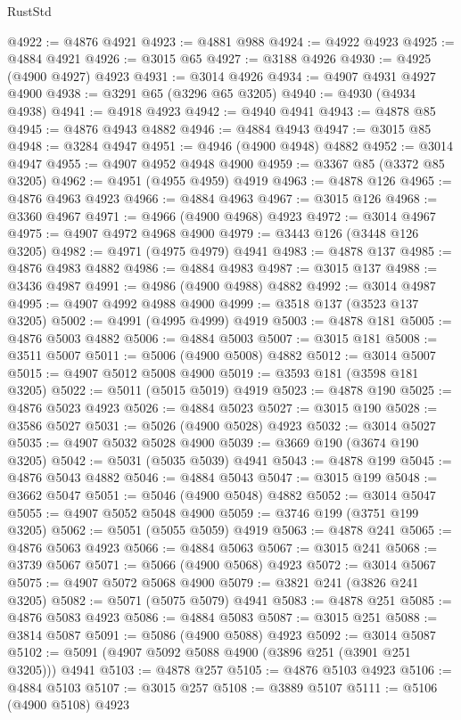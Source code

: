 \begin{lexlean}{RustStd}
\begin{coremodule}
@4922 := @4876 @4921
@4923 := @4881 @988
@4924 := @4922 @4923
@4925 := @4884 @4921
@4926 := @3015 @65
@4927 := @3188 @4926
@4930 := @4925 (@4900 @4927) @4923
@4931 := @3014 @4926
@4934 := @4907 @4931 @4927 @4900
@4938 := @3291 @65 (@3296 @65 @3205)
@4940 := @4930 (@4934 @4938)
@4941 := @4918 @4923
@4942 := @4940 @4941
@4943 := @4878 @85
@4945 := @4876 @4943 @4882
@4946 := @4884 @4943
@4947 := @3015 @85
@4948 := @3284 @4947
@4951 := @4946 (@4900 @4948) @4882
@4952 := @3014 @4947
@4955 := @4907 @4952 @4948 @4900
@4959 := @3367 @85 (@3372 @85 @3205)
@4962 := @4951 (@4955 @4959) @4919
@4963 := @4878 @126
@4965 := @4876 @4963 @4923
@4966 := @4884 @4963
@4967 := @3015 @126
@4968 := @3360 @4967
@4971 := @4966 (@4900 @4968) @4923
@4972 := @3014 @4967
@4975 := @4907 @4972 @4968 @4900
@4979 := @3443 @126 (@3448 @126 @3205)
@4982 := @4971 (@4975 @4979) @4941
@4983 := @4878 @137
@4985 := @4876 @4983 @4882
@4986 := @4884 @4983
@4987 := @3015 @137
@4988 := @3436 @4987
@4991 := @4986 (@4900 @4988) @4882
@4992 := @3014 @4987
@4995 := @4907 @4992 @4988 @4900
@4999 := @3518 @137 (@3523 @137 @3205)
@5002 := @4991 (@4995 @4999) @4919
@5003 := @4878 @181
@5005 := @4876 @5003 @4882
@5006 := @4884 @5003
@5007 := @3015 @181
@5008 := @3511 @5007
@5011 := @5006 (@4900 @5008) @4882
@5012 := @3014 @5007
@5015 := @4907 @5012 @5008 @4900
@5019 := @3593 @181 (@3598 @181 @3205)
@5022 := @5011 (@5015 @5019) @4919
@5023 := @4878 @190
@5025 := @4876 @5023 @4923
@5026 := @4884 @5023
@5027 := @3015 @190
@5028 := @3586 @5027
@5031 := @5026 (@4900 @5028) @4923
@5032 := @3014 @5027
@5035 := @4907 @5032 @5028 @4900
@5039 := @3669 @190 (@3674 @190 @3205)
@5042 := @5031 (@5035 @5039) @4941
@5043 := @4878 @199
@5045 := @4876 @5043 @4882
@5046 := @4884 @5043
@5047 := @3015 @199
@5048 := @3662 @5047
@5051 := @5046 (@4900 @5048) @4882
@5052 := @3014 @5047
@5055 := @4907 @5052 @5048 @4900
@5059 := @3746 @199 (@3751 @199 @3205)
@5062 := @5051 (@5055 @5059) @4919
@5063 := @4878 @241
@5065 := @4876 @5063 @4923
@5066 := @4884 @5063
@5067 := @3015 @241
@5068 := @3739 @5067
@5071 := @5066 (@4900 @5068) @4923
@5072 := @3014 @5067
@5075 := @4907 @5072 @5068 @4900
@5079 := @3821 @241 (@3826 @241 @3205)
@5082 := @5071 (@5075 @5079) @4941
@5083 := @4878 @251
@5085 := @4876 @5083 @4923
@5086 := @4884 @5083
@5087 := @3015 @251
@5088 := @3814 @5087
@5091 := @5086 (@4900 @5088) @4923
@5092 := @3014 @5087
@5102 := @5091 (@4907 @5092 @5088 @4900 (@3896 @251 (@3901 @251 @3205))) @4941
@5103 := @4878 @257
@5105 := @4876 @5103 @4923
@5106 := @4884 @5103
@5107 := @3015 @257
@5108 := @3889 @5107
@5111 := @5106 (@4900 @5108) @4923

\end{coremodule}
\end{lexlean}
